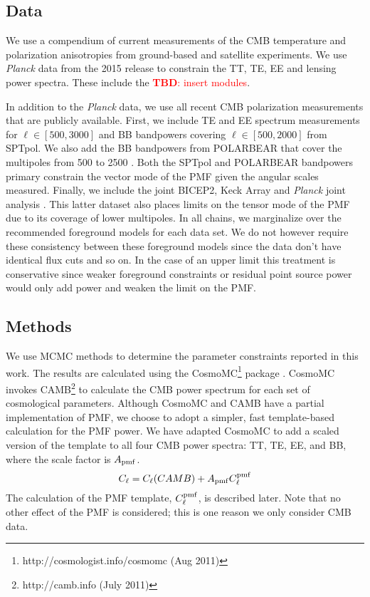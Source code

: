 \documentclass[preprint]{emulateapj}
\newcommand{\cpmf}{\ensuremath{C_{\ell}^{\rm pmf}}}
\newcommand{\apmf}{\ensuremath{A_{\rm pmf}}}
\newcommand{\be}{\begin{equation}}
\newcommand{\ee}{\end{equation}}
\newcommand{\planck}{{\sl Planck}}
\newcommand{\pb}{POLARBEAR}
\newcommand{\sptpol}{SPTpol}
\newcommand{\tbd}[1]{\textcolor{Red}{{\bf TBD}: #1}}
\begin{document}
\subsection{Data}

We use a compendium of current measurements of the CMB temperature and polarization anisotropies from ground-based and satellite experiments. 
We use \planck{} data from the 2015 release to constrain the TT, TE, EE and lensing power spectra. 
These include the \tbd{insert modules}. 

In addition to the \planck{} data, we use all recent CMB polarization measurements that are publicly available. 
First, we include TE and EE spectrum measurements\citep{crites15} for $\ell \in [500,3000]$ and BB bandpowers covering $\ell \in [500,2000]$ \citep{keisler15} from SPTpol. 
We also add the BB bandpowers from \pb{} that cover the multipoles from 500 to 2500 \citep{pb-bb15}. 
Both the \sptpol{} and \pb{} bandpowers primary constrain the vector mode of the PMF given the angular scales measured. 
Finally, we include the joint BICEP2, Keck Array and \planck{} joint analysis \citep{bicepkeckplanck15}. 
This latter dataset also places limits on the tensor mode of the PMF due to its coverage of lower multipoles. 
In all chains, we marginalize over the recommended foreground models for each data set. 
We do not however require these consistency between these foreground models since the data don't have identical flux cuts and so on. 
In the case of an upper limit this treatment is conservative since weaker foreground constraints or residual point source power would only add power and weaken the limit on the PMF. 

\subsection{Methods}

We use MCMC methods to determine the parameter constraints reported in this work. 
The results are calculated using  the {\textsc CosmoMC}\footnote{http://cosmologist.info/cosmomc (Aug 2011)} package \citep{lewis02b}. 
CosmoMC invokes  CAMB\footnote{http://camb.info (July 2011)}  \citep{lewis00} to calculate the CMB power spectrum for each set of cosmological parameters. 
Although CosmoMC and CAMB have a partial implementation of PMF, we choose to adopt a simpler, fast template-based calculation for the PMF power. 
We have adapted CosmoMC to add a scaled version of the template to all four CMB power spectra: TT, TE, EE, and BB, where the scale factor is \apmf. 
\be
C_\ell = C_\ell (CAMB) + \apmf \cpmf
\ee
The calculation of the PMF template, \cpmf, is described later. 
Note that no other effect of the PMF is considered; this is one reason we only consider CMB data.
\end{document}
